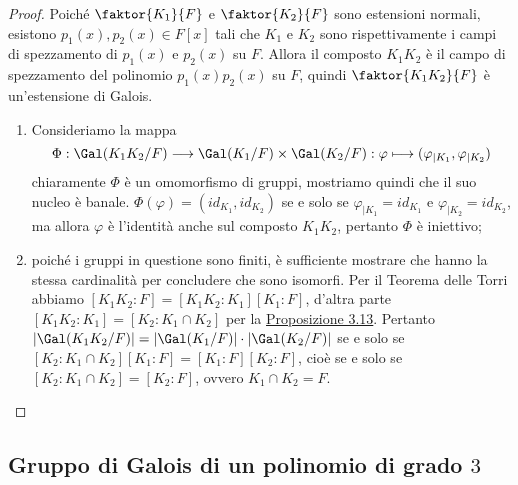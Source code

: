 \documentclass[11pt]{scrartcl}
\begin{document}
	\begin{proof}
		Poiché $\faktor{K_1}{F}$ e $\faktor{K_2}{F}$ sono estensioni normali, 
		esistono $p_1(x), p_2(x) \in F[x]$ tali che $K_1$ e $K_2$ 
		sono rispettivamente i campi di spezzamento di $p_1(x)$ e $p_2(x)$ su 
		$F$. Allora il composto $K_1K_2$ è il campo di spezzamento  
		del polinomio $p_1(x)p_2(x)$ su $F$, quindi $\faktor{K_1K_2}{F}$ è un'estensione 
		di Galois.
		\begin{enumerate}[(1)]
			\item Consideriamo la mappa
			\[
			\Phi: \Gal(K_1K_2/F)\longrightarrow \Gal(K_1/F)\times 
			\Gal(K_2/F): \varphi\longmapsto (\varphi_{\mid K_1}, \varphi_{\mid K_2})
			\]
			chiaramente $\Phi$ è un omomorfismo di gruppi, mostriamo quindi che 
			il suo nucleo è banale. $\Phi(\varphi) = (id_{K_1}, id_{K_2})$
			se e solo se $\varphi_{\mid K_1} = id_{K_1}$ e $\varphi_{\mid K_2} =
			id_{K_2}$, ma allora $\varphi$ è l'identità anche sul composto
			$K_1K_2$, pertanto $\Phi$ è iniettivo;
			\item poiché i gruppi in questione sono finiti, è sufficiente mostrare 
			che hanno la stessa cardinalità per concludere che sono isomorfi.
			Per il Teorema delle Torri abbiamo $[K_1K_2:F] = [K_1K_2:K_1][K_1:F]$,
			d'altra parte $[K_1K_2:K_1] = [K_2:K_1\cap K_2]$ per
			la \hyperref[prop3.13]{Proposizione 3.13}. Pertanto $|\Gal(K_1K_2/F)| =
			|\Gal(K_1/F)|\cdot |\Gal(K_2/F)|$ 
			se e solo se $[K_2:K_1\cap K_2][K_1:F] = [K_1:F][K_2:F]$, cioè se e 
			solo se $[K_2:K_1\cap K_2] = [K_2:F]$, ovvero $K_1\cap K_2 = F$.
		\end{enumerate}
	\end{proof}
	
	\newpage
	
	\subsection{Gruppo di Galois di un polinomio di grado $3$}
	
\end{document}
